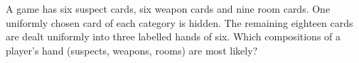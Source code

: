 A game has six suspect cards, six weapon cards and nine room cards. One uniformly chosen card of each category is hidden. The remaining eighteen cards are dealt uniformly into three labelled hands of six. Which compositions of a player's hand (suspects, weapons, rooms) are most likely?
